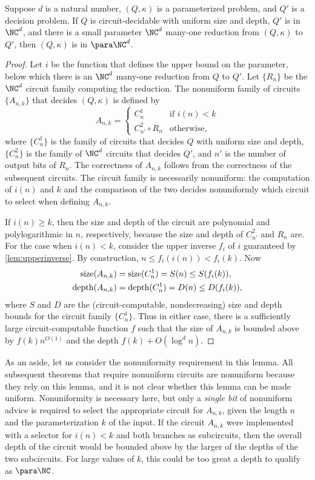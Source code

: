 \begin{lemma}\label{lem:spreduction}
  Suppose $d$ is a natural number, $(Q, \kappa)$ is a parameterized problem, and $Q'$ is a decision problem.
  If $Q$ is circuit-decidable with uniform size and depth, $Q'$ is in $\NC^d$, and there is a small parameter $\NC^d$ many-one reduction from $(Q, \kappa)$ to $Q'$, then $(Q, \kappa)$ is in $\para \NC^d$.
\end{lemma}
\begin{proof}
  Let $i$ be the function that defines the upper bound on the parameter, below which there is an $\NC^d$ many-one reduction from $Q$ to $Q'$.
  Let $\{R_n\}$ be the $\NC^d$ circuit family computing the reduction.
  The nonuniform family of circuits $\{A_{n, k}\}$ that decides $(Q, \kappa)$ is defined by
  \[
  A_{n, k} =
  \begin{cases}
    C_n^1 & \text{if } i(n) < k \\
    C_{n'}^2 \circ R_{n} & \text{otherwise},
  \end{cases}
  \]
  where $\{C_n^1\}$ is the family of circuits that decides $Q$ with uniform size and depth, $\{C_n^2\}$ is the family of $\NC^d$ circuits that decides $Q'$, and $n'$ is the number of output bits of $R_n$.
  The correctness of $A_{n, k}$ follows from the correctness of the subsequent circuits.
  The circuit family is necessarily nonuniform: the computation of $i(n)$ and $k$ and the comparison of the two decides nonuniformly which circuit to select when defining $A_{n, k}$.

  If $i(n) \geq k$, then the size and depth of the circuit are polynomial and polylogarithmic in $n$, respectively, because the size and depth of $C_{n'}^2$ and $R_n$ are.
  For the case when $i(n) < k$, consider the upper inverse $f_i$ of $i$ guaranteed by \autoref{lem:upperinverse}.
  By construction, $n \leq f_i(i(n)) < f_i(k)$.
  Now
  \begin{align*}
    \operatorname{size}(A_{n, k}) & = \operatorname{size}(C_n^1) = S(n) \leq S(f_i(k)), \\
    \operatorname{depth}(A_{n, k}) & = \operatorname{depth}(C_n^1) = D(n) \leq D(f_i(k)),
  \end{align*}
  where $S$ and $D$ are the (circuit-computable, nondecreasing) size and depth bounds for the circuit family $\{C_n^1\}$.
  Thus in either case, there is a sufficiently large circuit-computable function $f$ such that the size of $A_{n, k}$ is bounded above by $f(k) n^{O(1)}$ and the depth $f(k) + O(\log^d n)$.
\end{proof}

As an aside, let us consider the nonuniformity requirement in this lemma.
All subsequent theorems that require nonuniform circuits are nonuniform because they rely on this lemma, and it is not clear whether this lemma can be made uniform.
Nonuniformity is necessary here, but only a \emph{single bit} of nonuniform advice is required to select the appropriate circuit for $A_{n, k}$, given the length $n$ and the parameterization $k$ of the input.
If the circuit $A_{n, k}$ were implemented with a selector for $i(n) < k$ and both branches as subcircuits, then the overall depth of the circuit would be bounded above by the larger of the depths of the two subcircuits.
For large values of $k$, this could be too great a depth to qualify as $\para \NC$.

